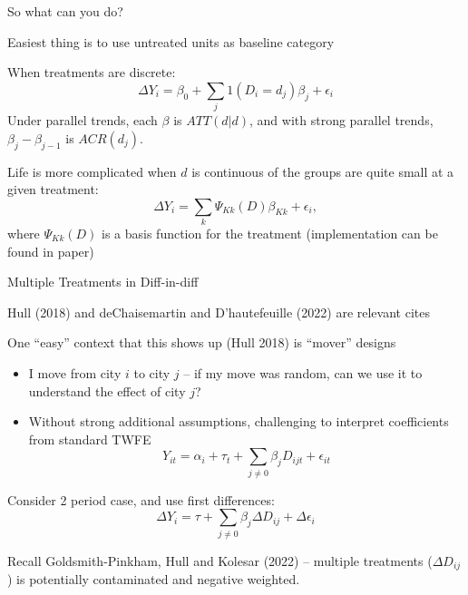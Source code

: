 \documentclass[notes,11pt, aspectratio=169]{beamer}
\newenvironment{wideitemize}{\itemize\addtolength{\itemsep}{10pt}}{\enditemize}
\begin{document}
\begin{frame}{So what can you do?}
  \begin{wideitemize}
    \item Easiest thing is to use untreated units as baseline category
    \item When treatments are discrete:
    \begin{equation}
      \Delta Y_{i} = \beta_{0} + \sum_{j}1(D_{i} = d_{j})\beta_{j} + \epsilon_{i}
    \end{equation}
    Under parallel trends, each $\beta$ is $ATT(d|d)$, and with strong parallel trends, $\beta_{j} - \beta_{j-1}$ is $ACR(d_{j})$. 
    \item Life is more complicated when $d$ is continuous of the groups are quite small at a given treatment:
    \begin{equation}
      \Delta Y_{i} = \sum_{k}\Psi_{Kk}(D)\beta_{Kk} + \epsilon_{i},
    \end{equation}
    where $\Psi_{Kk}(D)$ is a basis function for the treatment (implementation can be found in paper)
  \end{wideitemize}
\end{frame}

\begin{frame}{Multiple Treatments in Diff-in-diff}
  \begin{wideitemize}
  \item Hull (2018) and deChaisemartin and D'hautefeuille (2022) are relevant cites
  \item One ``easy'' context that this shows up (Hull 2018) is ``mover'' designs
    \begin{itemize}
    \item I move from city $i$ to city $j$ -- if my move was random,
      can we use it to understand the effect of city $j$?
    \item Without strong additional assumptions, challenging to
      interpret coefficients from standard TWFE
      \begin{equation}
        Y_{it} = \alpha_{i} + \tau_{t} + \sum_{j\not=0}\beta_{j}D_{ijt} + \epsilon_{it}
      \end{equation}
    \end{itemize}
  \item Consider 2 period case, and use first differences:
    \begin{equation}
      \Delta Y_{i} = \tau + \sum_{j\not=0}\beta_{j}\Delta D_{ij} + \Delta\epsilon_{i}          
    \end{equation}
  \item Recall Goldsmith-Pinkham, Hull and Kolesar (2022) -- multiple
    treatments ($\Delta D_{ij}$) is potentially contaminated and
    negative weighted.
  \end{wideitemize}
\end{frame}
\end{document}
